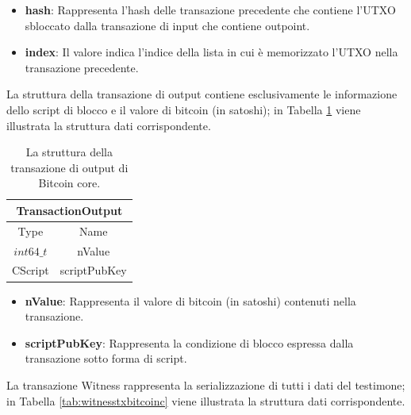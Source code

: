 \begin{itemize}
  \item {\bf hash\/}:  Rappresenta l’hash delle transazione precedente che contiene l’UTXO sbloccato dalla transazione di input che contiene outpoint.
  \item {\bf index\/}: Il valore indica l’indice della lista in cui è memorizzato l’UTXO nella transazione precedente.
\end{itemize}

La struttura della transazione di output contiene esclusivamente le informazione dello script di blocco e il valore di bitcoin (in satoshi); in Tabella \ref{tab:transactionOutput} viene illustrata la struttura dati corrispondente.

\begin{table}[H]
       \centering\small
           \begin{tabular}{|c|c|}
               \hline
                 \multicolumn{2}{|c|}{\textbf{TransactionOutput}} \\
                \hline \hline
                 \multicolumn{1}{|c|}{Type} & \multicolumn{1}{c|}{Name} \\
               \hline
               $int64\_t$ & nValue   \\
               \hline
               CScript & scriptPubKey \\
               \hline
       \end{tabular}
       \caption{La struttura della transazione di output di Bitcoin core.\label{tab:transactionOutput}}
   \end{table}

\begin{itemize}
  \item {\bf nValue\/}: Rappresenta il valore di bitcoin (in satoshi) contenuti nella transazione.
  \item {\bf scriptPubKey\/}: Rappresenta la condizione di blocco espressa dalla transazione sotto forma di script.
\end{itemize}

La transazione Witness rappresenta la serializzazione di tutti i dati del testimone; in Tabella \ref{tab:witnesstxbitcoinc} viene illustrata la  struttura dati corrispondente.

